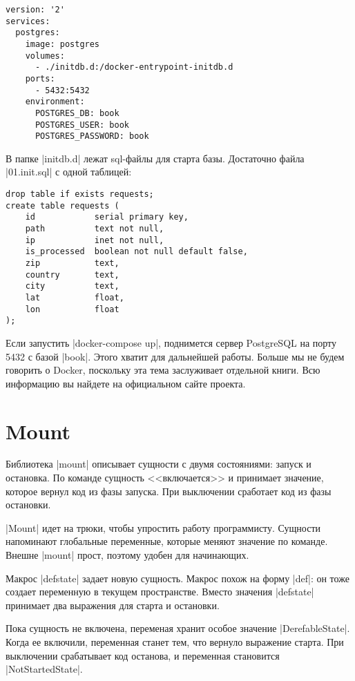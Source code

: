 \begin{verbatim}
version: '2'
services:
  postgres:
    image: postgres
    volumes:
      - ./initdb.d:/docker-entrypoint-initdb.d
    ports:
      - 5432:5432
    environment:
      POSTGRES_DB: book
      POSTGRES_USER: book
      POSTGRES_PASSWORD: book
\end{verbatim}

В папке \spverb|initdb.d| лежат sql-файлы для старта базы. Достаточно файла
\spverb|01.init.sql| с одной таблицей:

\begin{verbatim}
drop table if exists requests;
create table requests (
    id            serial primary key,
    path          text not null,
    ip            inet not null,
    is_processed  boolean not null default false,
    zip           text,
    country       text,
    city          text,
    lat           float,
    lon           float
);
\end{verbatim}

Если запустить \spverb|docker-compose up|, поднимется сервер PostgreSQL на порту
5432 с базой \spverb|book|. Этого хватит для дальнейшей работы. Больше мы не
будем говорить о Docker, поскольку эта тема заслуживает отдельной книги. Всю
информацию вы найдете на официальном сайте
проекта.

\section{Mount}

Библиотека \spverb|mount| описывает
сущности с двумя состояниями: запуск и остановка. По команде сущность
<<включается>> и принимает значение, которое вернул код из фазы запуска. При
выключении сработает код из фазы остановки.

\spverb|Mount| идет на трюки, чтобы упростить работу программисту. Сущности
напоминают глобальные переменные, которые меняют значение по команде. Внешне
\spverb|mount| прост, поэтому удобен для начинающих.

Макрос \spverb|defstate| задает новую сущность. Макрос похож на форму
\spverb|def|: он тоже создает переменную в текущем пространстве. Вместо значения
\spverb|defstate| принимает два выражения для старта и остановки.

Пока сущность не включена, переменая хранит особое значение
\spverb|DerefableState|. Когда ее включили, переменная станет тем, что вернуло
выражение старта. При выключении срабатывает код останова, и переменная
становится \spverb|NotStartedState|.

